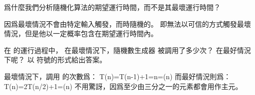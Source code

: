 \startsection[
  reference=section:rand_quicksort,
  title={A randomized version of quicksort},
]

\startEXERCISE
爲什麼我們分析隨機化算法的期望運行時間，而不是其最壞運行時間？
\stopEXERCISE

\startANSWER
因爲最壞情況不會由特定輸入觸發，而時隨機的。
即無法以可信的方式觸發最壞情況，但是他以一定概率包含在期望運行時間內。
\stopANSWER

\startEXERCISE
在  的運行過程中，
在最壞情況下，隨機數生成器  被調用了多少次？
在最好情況下呢？
以 \m{\Theta} 符號的形式給出答案。
\stopEXERCISE

\startANSWER
最壞情況下，調用  的次數爲：
\startformula
T(n)=T(n-1)+1=n=\Theta(n)
\stopformula
而最好情況則爲：
\startformula
T(n)=2T(n/2)+1=\Theta(n)
\stopformula
不用驚訝，因爲至少由三分之一的元素都會用作主元。
\stopANSWER

\stopsection
